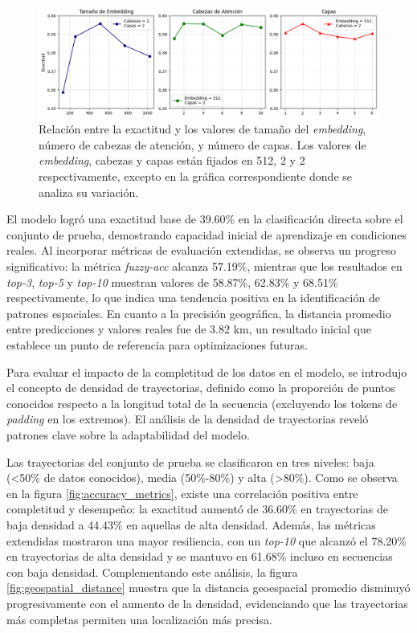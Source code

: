 \begin{figure}[!htb] \centering \includegraphics[width=1\textwidth]{Graphics/etecsa_hiperparameter_variability.png} \caption{Relación entre la exactitud y los valores de tamaño del \textit{embedding}, número de cabezas de atención, y número de capas. Los valores de \textit{embedding}, cabezas y capas están fijados en 512, 2 y 2 respectivamente, excepto en la gráfica correspondiente donde se analiza su variación.} \label{fig:etecsa_hiperparameter_variability} 
\end{figure}

El modelo logró una exactitud base de 39.60\% en la clasificación directa sobre el conjunto de prueba, demostrando capacidad inicial de aprendizaje en condiciones reales. Al incorporar métricas de evaluación extendidas, se observa un progreso significativo: la métrica \textit{fuzzy-acc} alcanza 57.19\%, mientras que los resultados en \textit{top-3}, \textit{top-5} y \textit{top-10} muestran valores de 58.87\%, 62.83\% y 68.51\% respectivamente, lo que indica una tendencia positiva en la identificación de patrones espaciales. En cuanto a la precisión geográfica, la distancia promedio entre predicciones y valores reales fue de 3.82 km, un resultado inicial que establece un punto de referencia para optimizaciones futuras.

Para evaluar el impacto de la completitud de los datos en el modelo, se introdujo el concepto de densidad de trayectorias, definido como la proporción de puntos conocidos respecto a la longitud total de la secuencia (excluyendo los tokens de \textit{padding} en los extremos). El análisis de la densidad de trayectorias reveló patrones clave sobre la adaptabilidad del modelo.

Las trayectorias del conjunto de prueba se clasificaron en tres niveles: baja (<50\% de datos conocidos), media (50\%-80\%) y alta (>80\%). Como se observa en la figura \ref{fig:accuracy_metrics}, existe una correlación positiva entre completitud y desempeño: la exactitud aumentó de 36.60\% en trayectorias de baja densidad a 44.43\% en aquellas de alta densidad. Además, las métricas extendidas mostraron una mayor resiliencia, con un \textit{top-10} que alcanzó el 78.20\% en trayectorias de alta densidad y se mantuvo en 61.68\% incluso en secuencias con baja densidad. Complementando este análisis, la figura \ref{fig:geospatial_distance} muestra que la distancia geoespacial promedio disminuyó progresivamente con el aumento de la densidad, evidenciando que las trayectorias más completas permiten una localización más precisa.

